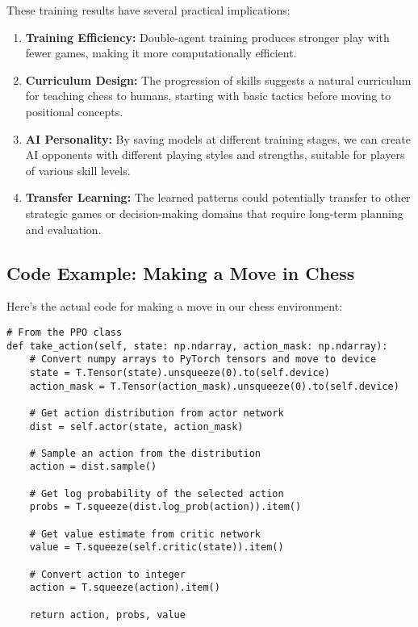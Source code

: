 \documentclass[11pt]{article}
\begin{document}
These training results have several practical implications:

\begin{enumerate}
    \item \textbf{Training Efficiency:} Double-agent training produces stronger play with fewer games, making it more computationally efficient.
    
    \item \textbf{Curriculum Design:} The progression of skills suggests a natural curriculum for teaching chess to humans, starting with basic tactics before moving to positional concepts.
    
    \item \textbf{AI Personality:} By saving models at different training stages, we can create AI opponents with different playing styles and strengths, suitable for players of various skill levels.
    
    \item \textbf{Transfer Learning:} The learned patterns could potentially transfer to other strategic games or decision-making domains that require long-term planning and evaluation.
\end{enumerate}

\subsection{Code Example: Making a Move in Chess}

Here's the actual code for making a move in our chess environment:

\begin{lstlisting}[style=Python]
# From the PPO class
def take_action(self, state: np.ndarray, action_mask: np.ndarray):
    # Convert numpy arrays to PyTorch tensors and move to device
    state = T.Tensor(state).unsqueeze(0).to(self.device)
    action_mask = T.Tensor(action_mask).unsqueeze(0).to(self.device)
    
    # Get action distribution from actor network
    dist = self.actor(state, action_mask)
    
    # Sample an action from the distribution
    action = dist.sample()
    
    # Get log probability of the selected action
    probs = T.squeeze(dist.log_prob(action)).item()
    
    # Get value estimate from critic network
    value = T.squeeze(self.critic(state)).item()
    
    # Convert action to integer
    action = T.squeeze(action).item()
    
    return action, probs, value
\end{lstlisting}
\end{document}
